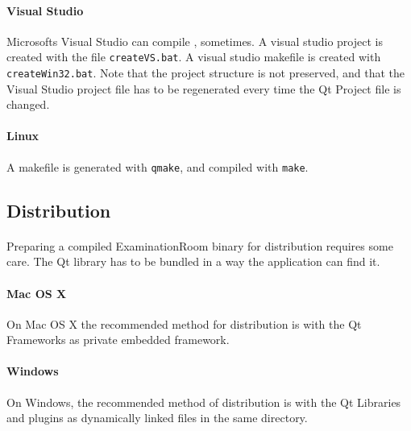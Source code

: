 \paragraph{Visual Studio}
Microsofts Visual Studio can compile \ER, sometimes.
A visual studio project is created with the file \texttt{createVS.bat}.
A visual studio makefile is created with \texttt{createWin32.bat}.
Note that the project structure is not preserved, and that the Visual Studio project file has to be regenerated every time the Qt Project file is changed.

\paragraph{Linux}
A makefile is generated with \texttt{qmake}, and compiled with \texttt{make}.


\subsection{Distribution}
\paragraph{}
Preparing a compiled ExaminationRoom binary for distribution requires some care.
The Qt library has to be bundled in a way the application can find it.

\paragraph{Mac OS X}
On Mac OS X the recommended method for distribution is with the Qt Frameworks as private embedded framework.

\paragraph{Windows}
On Windows, the recommended method of distribution is with the Qt Libraries and plugins as dynamically linked files in the same directory.
